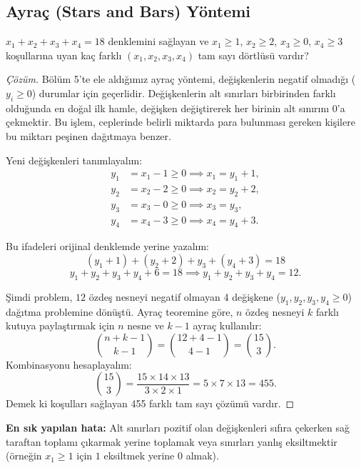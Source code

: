 \subsection{Ayraç (Stars and Bars) Yöntemi}

\begin{example}
$x_1 + x_2 + x_3 + x_4 = 18$ denklemini sağlayan ve $x_1 \ge 1$, $x_2 \ge 2$, $x_3 \ge 0$, $x_4 \ge 3$ koşullarına uyan kaç farklı $(x_1, x_2, x_3, x_4)$ tam sayı dörtlüsü vardır?
\end{example}

\begin{proof}[Çözüm]
Bölüm 5'te ele aldığımız ayraç yöntemi, değişkenlerin negatif olmadığı ($y_i \ge 0$) durumlar için geçerlidir. Değişkenlerin alt sınırları birbirinden farklı olduğunda en doğal ilk hamle, değişken değiştirerek her birinin alt sınırını $0$'a çekmektir. Bu işlem, ceplerinde belirli miktarda para bulunması gereken kişilere bu miktarı peşinen dağıtmaya benzer.

Yeni değişkenleri tanımlayalım:
\begin{align*}
y_1 &= x_1 - 1 \ge 0 \implies x_1 = y_1 + 1, \\
y_2 &= x_2 - 2 \ge 0 \implies x_2 = y_2 + 2, \\
y_3 &= x_3 - 0 \ge 0 \implies x_3 = y_3, \\
y_4 &= x_4 - 3 \ge 0 \implies x_4 = y_4 + 3.
\end{align*}

Bu ifadeleri orijinal denklemde yerine yazalım:
\[
(y_1 + 1) + (y_2 + 2) + y_3 + (y_4 + 3) = 18
\]
\[
y_1 + y_2 + y_3 + y_4 + 6 = 18 \implies y_1 + y_2 + y_3 + y_4 = 12.
\]

Şimdi problem, $12$ özdeş nesneyi negatif olmayan 4 değişkene ($y_1, y_2, y_3, y_4 \ge 0$) dağıtma problemine dönüştü. Ayraç teoremine göre, $n$ özdeş nesneyi $k$ farklı kutuya paylaştırmak için $n$ nesne ve $k - 1$ ayraç kullanılır:
\[
\binom{n + k - 1}{k - 1} = \binom{12 + 4 - 1}{4 - 1} = \binom{15}{3}.
\]
Kombinasyonu hesaplayalım:
\[
\binom{15}{3} = \frac{15 \times 14 \times 13}{3 \times 2 \times 1} = 5 \times 7 \times 13 = 455.
\]
Demek ki koşulları sağlayan 455 farklı tam sayı çözümü vardır.
\end{proof}

\textbf{En sık yapılan hata:} Alt sınırları pozitif olan değişkenleri sıfıra çekerken sağ taraftan toplamı çıkarmak yerine toplamak veya sınırları yanlış eksiltmektir (örneğin $x_1 \ge 1$ için $1$ eksiltmek yerine $0$ almak).

